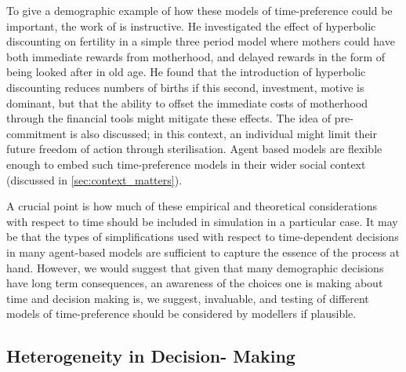 \documentclass{article}
\begin{document}
To give a demographic example of how these models of time-preference could be important, the work of  \cite{Wrede2011} is instructive. He investigated the effect of hyperbolic discounting on fertility in a simple three period model where mothers could have both immediate rewards from motherhood, and delayed rewards in the form of being looked after in old age. He found that the introduction of hyperbolic discounting reduces numbers of births if this second, investment, motive is dominant, but that the ability to offset the immediate costs of motherhood through the financial tools might mitigate these effects. The idea of pre-commitment is also discussed; in this context, an individual might limit their future freedom of action through sterilisation. Agent based models are flexible enough to embed such time-preference models in their wider social context (discussed in \ref{sec:context_matters}).


A crucial point is how much of these empirical and theoretical considerations with respect to time should be included in simulation in a particular case. It may be that the types of simplifications used with respect to time-dependent decisions in many agent-based models are sufficient to capture the essence of the process at hand. However, we would suggest that given that many demographic decisions have long term consequences, an awareness of the choices one is making about time and decision making is, we suggest, invaluable, and testing of different models of time-preference should be considered by modellers if plausible.




\subsection{Heterogeneity in Decision-
Making}\label{heterogeneity-in-decision-strategies}
\end{document}
